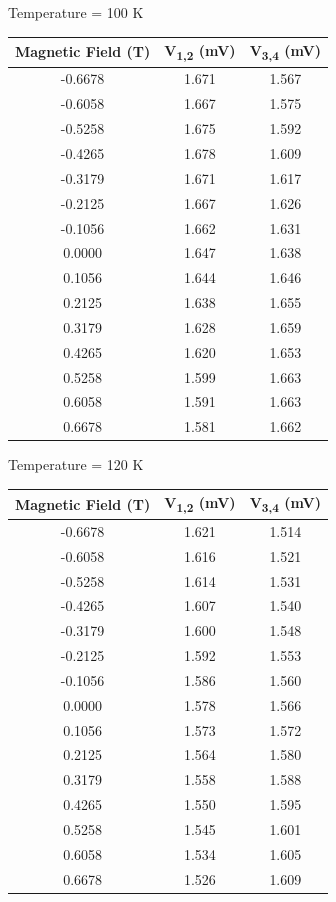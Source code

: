 \documentclass[twocolumn]{article}
\begin{document}
\begin{minipage}{\linewidth}
\Centering
Temperature = 100 K
\begin{tabular}{|c|c|c|}
\hline
Magnetic Field (T) & V\textsubscript{1,2} (mV) & V\textsubscript{3,4} (mV) \\ \hline
-0.6678 & 1.671 & 1.567 \\ \hline
-0.6058 & 1.667 & 1.575 \\ \hline
-0.5258 & 1.675 & 1.592 \\ \hline
-0.4265 & 1.678 & 1.609 \\ \hline
-0.3179 & 1.671 & 1.617 \\ \hline
-0.2125 & 1.667 & 1.626 \\ \hline
-0.1056 & 1.662 & 1.631 \\ \hline
0.0000 & 1.647 & 1.638 \\ \hline
0.1056 & 1.644 & 1.646 \\ \hline
0.2125 & 1.638 & 1.655 \\ \hline
0.3179 & 1.628 & 1.659 \\ \hline
0.4265 & 1.620 & 1.653 \\ \hline
0.5258 & 1.599 & 1.663 \\ \hline
0.6058 & 1.591 & 1.663 \\ \hline
0.6678 & 1.581 & 1.662 \\ \hline
\end{tabular}
\end{minipage}
\begin{minipage}{\linewidth}
\Centering
Temperature = 120 K
\begin{tabular}{|c|c|c|}
\hline
Magnetic Field (T) & V\textsubscript{1,2} (mV) & V\textsubscript{3,4} (mV) \\ \hline
-0.6678 & 1.621 & 1.514 \\ \hline
-0.6058 & 1.616 & 1.521 \\ \hline
-0.5258 & 1.614 & 1.531 \\ \hline
-0.4265 & 1.607 & 1.540 \\ \hline
-0.3179 & 1.600 & 1.548 \\ \hline
-0.2125 & 1.592 & 1.553 \\ \hline
-0.1056 & 1.586 & 1.560 \\ \hline
0.0000 & 1.578 & 1.566 \\ \hline
0.1056 & 1.573 & 1.572 \\ \hline
0.2125 & 1.564 & 1.580 \\ \hline
0.3179 & 1.558 & 1.588 \\ \hline
0.4265 & 1.550 & 1.595 \\ \hline
0.5258 & 1.545 & 1.601 \\ \hline
0.6058 & 1.534 & 1.605 \\ \hline
0.6678 & 1.526 & 1.609 \\ \hline
\end{tabular}
\end{minipage}
\end{document}
